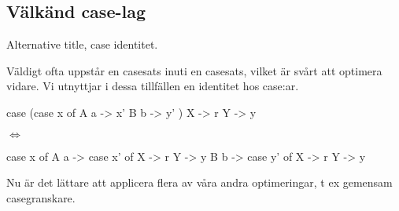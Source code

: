 \documentclass[../Optimise]{subfiles}
\begin{document}
\subsection{Välkänd case-lag}
Alternative title, case identitet. 

Väldigt ofta uppstår en casesats inuti en casesats, vilket är svårt att optimera vidare. Vi utnyttjar i dessa tillfällen en identitet hos case:ar. 
\begin{codeEx}
 case (case x of
         A a -> x'
         B b -> y'
      )
   X -> r
   Y -> y

\end{codeEx}
 
$\Leftrightarrow$

\begin{codeEx}
 case x of
     A a -> case x' of
              X -> r
              Y -> y
     B b -> case y' of
              X -> r
              Y -> y
\end{codeEx}

Nu är det lättare att applicera flera av våra andra optimeringar, t ex gemensam casegranskare. 
\end{document}
